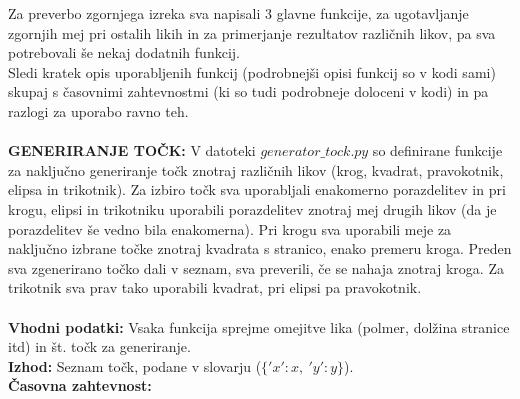 \documentclass[a4paper]{report}
\begin{document}
Za preverbo zgornjega izreka sva napisali 3 glavne funkcije, za ugotavljanje zgornjih mej pri ostalih likih in za primerjanje rezultatov različnih likov, pa sva potrebovali še nekaj dodatnih funkcij. \\
Sledi kratek opis uporabljenih funkcij (podrobnejši opisi funkcij so v kodi sami) skupaj s časovnimi zahtevnostmi (ki so tudi podrobneje doloceni v kodi) in pa razlogi za uporabo ravno teh. \\ \\
\textbf{GENERIRANJE TOČK: } V datoteki \colorbox{gray!10}{$generator\_tock.py$} so definirane funkcije za naključno generiranje točk znotraj različnih likov (krog, kvadrat, pravokotnik, elipsa in trikotnik). Za izbiro točk sva uporabljali enakomerno porazdelitev in pri krogu, elipsi in trikotniku uporabili porazdelitev znotraj mej drugih likov (da je porazdelitev še vedno bila enakomerna). Pri krogu sva uporabili meje za naključno izbrane točke znotraj kvadrata s stranico, enako premeru kroga. Preden sva zgenerirano točko dali v seznam, sva preverili, če se nahaja znotraj kroga. Za trikotnik sva prav tako uporabili kvadrat, pri elipsi pa pravokotnik.\\ \\
\textbf{Vhodni podatki:} Vsaka funkcija sprejme omejitve lika (polmer, dolžina stranice itd) in št. točk za generiranje. \\ 
\textbf{Izhod:} Seznam točk, podane v slovarju ($\{'x' : x, \ 'y' :  y\}$).  \\ 
\textbf{Časovna zahtevnost:} \\ \\
\end{document}
